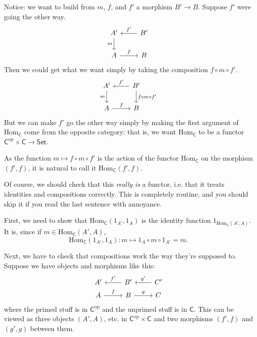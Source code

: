 \documentclass[a4paper,10pt]{scrreprt}
\newcommand{\Hom}{\mathrm{Hom}}
\theoremstyle{definition}
\theoremstyle{plain}
\theoremstyle{remark}
\begin{document}
Notice: we want to build from $m$, $f$, and $f'$ a morphism $B' \to B$. Suppose $f'$ were going the other way.
\begin{equation*}
  \begin{tikzcd}
    A' 
    \arrow[d, swap, "m"]
    & B'
    \arrow[l, swap, "f'"]
    \\
    A
    \arrow[r, "f"]
    & B
  \end{tikzcd}
\end{equation*}
Then we could get what we want simply by taking the composition $f \circ m \circ f'$.
\begin{equation*}
  \begin{tikzcd}
    A' 
    \arrow[d, swap, "m"]
    & B'
    \arrow[l, swap, "f'"]
    \arrow[d, "f \circ m \circ f'"]
    \\
    A
    \arrow[r, "f"]
    & B
  \end{tikzcd}
\end{equation*}
But we can make $f'$ go the other way simply by making the first argument of $\Hom_{\mathsf{C}}$ come from the opposite category: that is, we want $\Hom_{\mathsf{C}}$ to be a functor $\mathsf{C}^{\text{op}} \times \mathsf{C} \to \mathsf{Set}$.

As the function $m \mapsto f \circ m \circ f'$ is the action of the functor $\Hom_{\mathsf{C}}$ on the morphism $(f', f)$, it is natural to call it $\mathrm{Hom}_{\mathsf{C}}(f', f)$.

Of course, we should check that this \emph{really is} a functor, i.e. that it treats identities and compositions correctly. This is completely routine, and you should skip it if you read the last sentence with annoyance. 

First, we need to show that $\Hom_{\mathsf{C}}(1_{A'}, 1_{A})$ is the identity function $1_{\Hom_{\mathsf{C}}(A', A)}$. It is, since if $m \in \Hom_{\mathsf{C}}(A', A)$,
\begin{equation*}
  \Hom_{\mathsf{C}}(1_{A'}, 1_{A})\colon m \mapsto 1_{A} \circ m \circ 1_{A'} = m.
\end{equation*}

Next, we have to check that compositions work the way they're supposed to. Suppose we have objects and morphisms like this:
\begin{equation*}
  \begin{tikzcd}[row sep=tiny]
    A'
    & B'
    \arrow[l, swap, "f'"]
    & C'
    \arrow[l, swap, "g'"]
    \\
    A
    \arrow[r, "f"]
    & B
    \arrow[r, "g"]
    & C
  \end{tikzcd}
\end{equation*}
where the primed stuff is in $\mathsf{C}^{\mathrm{op}}$ and the unprimed stuff is in $\mathsf{C}$. This can be viewed as three objects $(A', A)$, etc. in $\mathsf{C}^{\mathrm{op}} \times \mathsf{C}$ and two morphisms  $(f', f)$ and $(g', g)$ between them.
\end{document}
